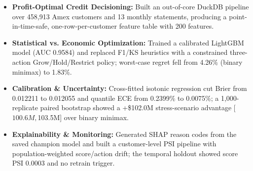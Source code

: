 \begin{itemize}
    \item \textbf{Profit-Optimal Credit Decisioning:} Built an out-of-core DuckDB pipeline over 458,913 Amex customers and 13 monthly statements, producing a point-in-time-safe, one-row-per-customer feature table with 200 features.
    \item \textbf{Statistical vs. Economic Optimization:} Trained a calibrated LightGBM model (AUC 0.9584) and replaced F1/KS heuristics with a constrained three-action Grow/Hold/Restrict policy; worst-case regret fell from 4.26\% (binary minimax) to 1.83\%.
    \item \textbf{Calibration \& Uncertainty:} Cross-fitted isotonic regression cut Brier from 0.012211 to 0.012055 and quantile ECE from 0.2399\% to 0.0075\%; a 1,000-replicate paired bootstrap showed a +\$102.0M stress-scenario advantage [$100.6M, $103.5M] over binary minimax.
    \item \textbf{Explainability \& Monitoring:} Generated SHAP reason codes from the saved champion model and built a customer-level PSI pipeline with population-weighted score/action drift; the temporal holdout showed score PSI 0.0003 and no retrain trigger.
\end{itemize}
